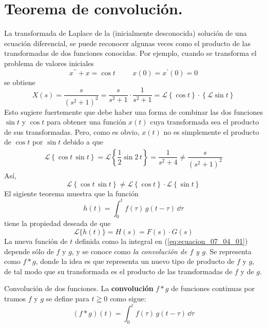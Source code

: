 \section{Teorema de convolución.}
La transformada de Laplace de la (inicialmente desconocida) solución de una ecuación diferencial, se puede reconocer algunas veces como el producto de las transformadas de dos funciones conocidas. Por ejemplo, cuando se transforma el problema de valores iniciales
\[ x^{\prime \prime} + x = \cos t \hspace{1cm} x(0) = x^{\prime}(0) = 0 \]
se obtiene
\[ X(s) = \dfrac{s}{(s^{2} + 1)^{2}} = \dfrac{s}{s^{2} + 1} \cdot \dfrac{1}{s^{2} + 1} = \mathscr{L} \left\{ \cos t \right\} \cdot \left\{ \mathscr{L} \sin t \right\} \]
Esto sugiere fuertemente que debe haber una forma de combinar las dos funciones $\sin t$ y $\cos t$ para obtener una función $x(t)$ cuya transformada sea el producto de sus transformadas. Pero, como es obvio, $x(t)$ no es simplemente el producto de $\cos t$ por $\sin t$ debido a que 
\begin{align*}
\mathscr{L} \left\{ \cos t \, \sin t \right\} = \mathscr{L} \left\{ \dfrac{1}{2} \sin 2 \, t \right\} = \dfrac{1}{s^{2} + 4} \neq \dfrac{s}{(s^{2} + 1)^{2}}
\end{align*}
Así,
\[ \mathscr{L} \left\{ \cos t \, \sin t \right\} \neq \mathscr{L} \left\{ \cos t \right\} \cdot \mathscr{L} \left\{ \sin t \right\} \]
El sigiente teorema muestra que la función
\begin{equation}
h(t) = \int_{0}^{t} f(\tau) \, g(t - \tau) \, \dd \tau
\label{eq:ecuacion_07_04_01}
\end{equation}
tiene la propiedad deseada de que
\begin{equation}
\mathscr{L} \{ h(t) \} = H(s) = F(s) \cdot G(s)
\label{eq:ecuacion_07_04_02}
\end{equation}
La nueva función de $t$ definida como la integral en (\ref{eq:ecuacion_07_04_01}) depende sólo de $f$ y $g$, y se  conoce como \emph{la convolución de $f$ y $g$}. Se representa como $f * g$, donde la idea es que representa un nuevo tipo de producto de $f$  y $g$, de tal modo que su transformada es el producto de las transformadas de $f$  y de $g$.
\begin{defi}{Convolución de dos funciones.}
La \textbf{convolución} $f * g$ de funciones continuas por tramos $f$ y $g$ se define para $t \geqq 0$ como sigue:
\begin{equation}
(f * g)(t) = \int_{0}^{t} f(\tau) \, g(t - \tau) \, \dd \tau
\label{eq:ecuacion_07_04_03}
\end{equation}
\end{defi}
